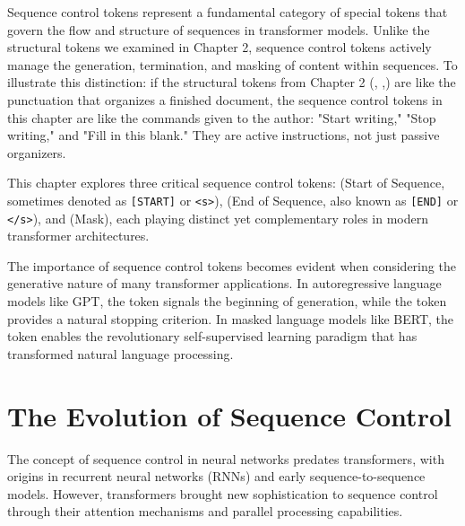 
Sequence control tokens represent a fundamental category of special tokens that govern the flow and structure of sequences in transformer models. Unlike the structural tokens we examined in Chapter 2, sequence control tokens actively manage the generation, termination, and masking of content within sequences. To illustrate this distinction: if the structural tokens from Chapter 2 (\cls{}, \sep{}) are like the punctuation that organizes a finished document, the sequence control tokens in this chapter are like the commands given to the author: "Start writing," "Stop writing," and "Fill in this blank." They are active instructions, not just passive organizers.

This chapter explores three critical sequence control tokens: \sos{} (Start of Sequence, sometimes denoted as \texttt{[START]} or \texttt{<s>}), \eos{} (End of Sequence, also known as \texttt{[END]} or \texttt{</s>}), and \mask{} (Mask), each playing distinct yet complementary roles in modern transformer architectures.
\begin{comment}
Feedback: Mention SOS is sometimes called [START], EOS is sometimes called [END] in different literature. Or "<s>", "</s>".

STATUS: addressed - added alternative notations used in different literature
\end{comment}

The importance of sequence control tokens becomes evident when considering the generative nature of many transformer applications. In autoregressive language models like GPT, the \sos{} token signals the beginning of generation, while the \eos{} token provides a natural stopping criterion. In masked language models like BERT, the \mask{} token enables the revolutionary self-supervised learning paradigm that has transformed natural language processing.

\section{The Evolution of Sequence Control}

The concept of sequence control in neural networks predates transformers, with origins in recurrent neural networks (RNNs) and early sequence-to-sequence models. However, transformers brought new sophistication to sequence control through their attention mechanisms and parallel processing capabilities.

